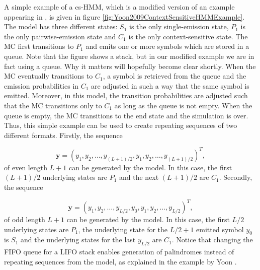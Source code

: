 \documentclass{article}\usepackage[]{graphicx}\usepackage[]{color}
\begin{document}
A simple example of a cs-HMM, which is a modified version of an example appearing in \cite{Yoon2009}, is given in figure \ref{fig:Yoon2009ContextSensitiveHMMExample}. The model has three different states: $S_1$ is the only single-emission state, $P_1$ is the only pairwise-emission state and $C_1$ is the only context-sensitive state. The MC first transitions to $P_1$ and emits one or more symbols which are stored in a queue. Note that the figure shows a stack, but in our modified example we are in fact using a queue. Why it matters will hopefully become clear shortly. When the MC eventually transitions to $C_1$, a symbol is retrieved from the queue and the emission probabilities in $C_1$ are adjusted in such a way that the same symbol is emitted. Moreover, in this model, the transition probabilities are adjusted such that the MC transitions only to $C_1$ as long as the queue is not empty. When the queue is empty, the MC transitions to the end state and the simulation is over. Thus, this simple example can be used to create repeating sequences of two different formats. Firstly, the sequence 

\begin{equation*}
    \mathbf{y} = (y_1, y_2, \ldots, y_{(L+1)/2}, y_1, y_2, \ldots, y_{(L+1)/2})^T, 
\end{equation*}
of even length $L+1$ can be generated by the model. In this case, the first $(L+1)/2$ underlying states are $P_1$ and the next $(L+1)/2$ are $C_1$. Secondly, the sequence 

\begin{equation*}
    \mathbf{y} = (y_1, y_2, \ldots, y_{L/2}, y_0, y_1, y_2, \ldots, y_{L/2})^T,
\end{equation*}
of odd length $L+1$ can be generated by the model. In this case, the first $L/2$ underlying states are $P_1$, the underlying state for the $L/2 + 1$ emitted symbol $y_0$ is $S_1$ and the underlying states for the last $y_{L/2}$ are $C_1$. Notice that changing the FIFO queue for a LIFO stack enables generation of  palindromes instead of repeating sequences from the model, as explained in the example by Yoon \cite{Yoon2009}. 
\end{document}

